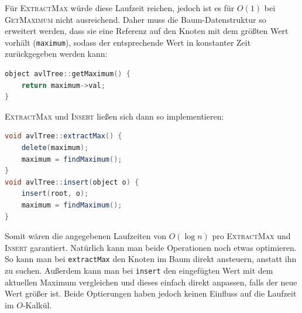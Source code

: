 \documentclass[11pt,a4paper]{article}
\begin{document}
\begin{loesung}
\begin{enumerate}
        Für \textsc{ExtractMax} würde diese Laufzeit reichen, jedoch ist es für $O(1)$ bei \textsc{GetMaximum} nicht ausreichend.
        Daher muss die Baum-Datenstruktur so erweitert werden, dass sie eine Referenz auf den Knoten mit dem größten Wert vorhält (\texttt{maximum}), sodass der entsprechende Wert in konstanter Zeit zurückgegeben werden kann:
        \begin{lstlisting}[language=c++]
object avlTree::getMaximum() {
    return maximum->val;
}
        \end{lstlisting}
        \textsc{ExtractMax} und \textsc{Insert} ließen sich dann so implementieren:
        \begin{lstlisting}[language=java]
void avlTree::extractMax() {
    delete(maximum);
    maximum = findMaximum();
}
void avlTree::insert(object o) {
    insert(root, o);
    maximum = findMaximum();
}
        \end{lstlisting}
        Somit wären die angegebenen Laufzeiten von $O(\log n)$ pro \textsc{ExtractMax} und \textsc{Insert} garantiert.
        Natürlich kann man beide Operationen noch etwas optimieren.
        So kann man bei \texttt{extractMax} den Knoten im Baum direkt ansteuern, anstatt ihn zu suchen.
        Außerdem kann man bei \texttt{insert} den eingefügten Wert mit dem aktuellen Maximum vergleichen und dieses einfach direkt anpassen, falls der neue Wert größer ist.
        Beide Optierungen haben jedoch keinen Einfluss auf die Laufzeit im $O$-Kalkül.
    \end{enumerate}

\end{loesung}
\end{document}
